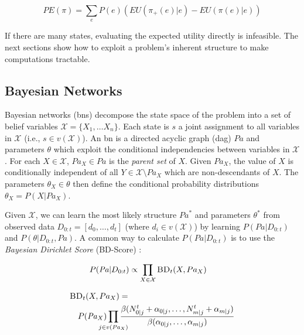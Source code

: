 \documentclass{article}
\newcommand{\bn}{{\sc bn}}
\newcommand{\Pa}{\mathit{Pa}}
\renewcommand{\dag}{{\sc dag}}
\begin{document}
	\begin{equation}
	\label{eqn:policy-error}
	PE(\pi) = \sum_e P(e) \left(EU(\pi_+(e) | e) - EU(\pi(e) | e)\right)
	\end{equation}
	
	If there are many states, evaluating the expected utility directly is infeasible. The next sections show how to exploit a problem's inherent structure to make computations tractable.
	
	\subsection{Bayesian Networks}
	\label{sec:bns}
	
	Bayesian networks (\bn{}s) decompose the state space of the problem into a set of belief variables $\mathcal{X} = \{ X_1, \dots X_n \}$. Each state is $s$ a joint assignment to all variables in $\mathcal{X}$ (i.e., $s \in v(\mathcal{X})$). An \bn{} is a directed acyclic graph (\dag) $\Pa$ and parameters $\theta$ which exploit the conditional independencies between variables in $\mathcal{X}$. For each $X \in \mathcal{X}$, $\Pa_X \in \Pa$ is the \emph{parent set} of $X$. Given $Pa_X$, the value of $X$ is conditionally independent of all $Y \in \mathcal{X} \setminus \Pa_X$ which are non-descendants of $X$. The parameters $\theta_X \in \theta$ then define the conditional probability distributions $\theta_X = P(X | \Pa_X)$.
	
	Given $\mathcal{X}$, we can learn the most likely structure $\Pa^*$ and parameters $\theta^*$ from observed data $D_{0:t} = [d_0, \dots, d_t]$ (where $d_i \in v(\mathcal{X})$) by learning $P(\Pa | D_{0:t})$ and $P(\theta | D_{0:t}, \Pa)$. A common way to calculate $P(\Pa | D_{0:t})$ is to use the \emph{Bayesian Dirichlet Score} (BD-Score) \citep{heckerman_learning_1995}:
		
	\begin{align}
	\label{eqn:struct-posterior}
	&P(\Pa | D_{0:t}) \propto \prod_{X \in \mathcal{X}} \textsc{BD}_t(X, Pa_X)
	\end{align}
	
	\begin{align}
		\label{eqn:fam-score}
		&\textsc{BD}_t(X, Pa_X) = \nonumber\\
		&\quad P(\Pa_X) \prod_{\mathclap{j \in v(\Pa_X)}} \frac{\beta(N^t_{0|j} + \alpha_{0|j}, \dots , N^t_{m | j} + \alpha_{m | j})}{\beta(\alpha_{0 | j}, \dots, \alpha_{m|j})}
	\end{align}
	
\end{document}
